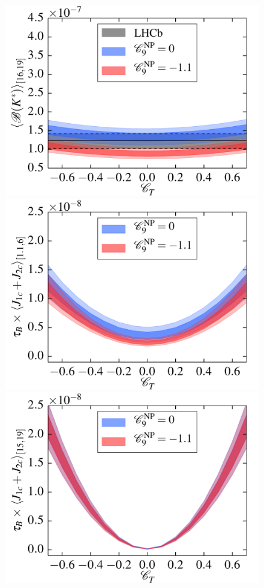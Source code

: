\documentclass[twocolumn,epjc3]{svjour3}
\numberwithin{equation}{section}
\renewcommand{\[}{\big[}
\renewcommand{\]}{\big]}
\renewcommand{\(}{\big(}
\renewcommand{\)}{\big)}
\newlength{\relwidth}
\begin{document}
\begin{figure}
\begin{center}
    \includegraphics[width=\relwidth]{plots/pdf/ct_Kstar_BR16to19}
    \\
    \includegraphics[width=\relwidth]{plots/pdf/ct_Kstar_J_1c_plus_J_2c1to6}
    \includegraphics[width=\relwidth]{plots/pdf/ct_Kstar_J_1c_plus_J_2c15to19}

\end{center}
\end{figure}
\end{document}
